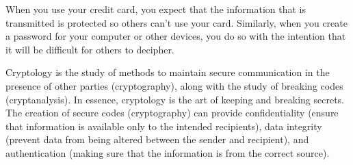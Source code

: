  \label{sec:bases_dimension}

\vspace*{-17 pt}

\vspace*{13 pt}


When you use your credit card, you expect that the information that is transmitted is protected so others can't use your card. Similarly, when you create a password for your computer or other devices, you do so with the intention that it will be difficult for others to decipher. 

Cryptology is the study of methods to maintain secure communication in the presence of other parties (cryptography), along with the study of breaking codes (cryptanalysis). In essence, cryptology is the art of keeping and breaking secrets. The creation of secure codes (cryptography) can provide confidentiality (ensure that information is available only to the intended recipients), data integrity (prevent data from being altered between the sender and recipient), and authentication (making sure that the information is from the correct source). 

